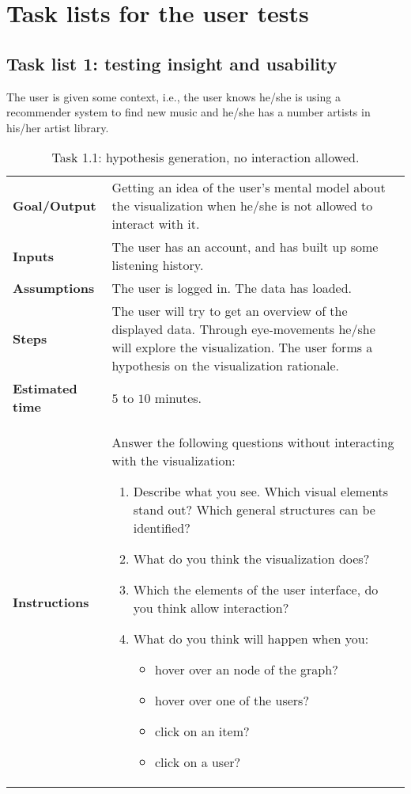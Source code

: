 \chapter{Task lists for the user tests}\label{appendix:tasklists}

\section{Task list 1: testing insight and usability}\label{appendix:tasklists:prototype1}

The user is given some context, i.e., the user knows he/she is using a recommender system to find new music and he/she has a number artists in his/her artist library.

\begin{table}
	\caption{Task 1.1: hypothesis generation, no interaction allowed.}
	\begin{tabular}{ p{80px} | p{350px} }
		\hline
		\textbf{Goal/Output}			& Getting an idea of the user's mental model about the visualization when he/she is not allowed to interact with it. \\
		\textbf{Inputs}						& The user has an account, and has built up some listening history. \\
		\textbf{Assumptions}			& The user is logged in. The data has loaded. \\
		\textbf{Steps}						& The user will try to get an overview of the displayed data. Through eye-movements he/she will explore the visualization. The user forms a hypothesis on the visualization rationale. \\
		\textbf{Estimated time} 	& $5$ to $10$ minutes. \\
		\textbf{Instructions}			&
		
		Answer the following questions without interacting with the visualization:
		\begin{enumerate}
			\item Describe what you see. Which visual elements stand out? Which general structures can be identified?
			\item What do you think the visualization does?
			\item Which the elements of the user interface, do you think allow interaction?
			\item What do you think will happen when you:
				\begin{itemize}
					\item hover over an node of the graph?
					\item hover over one of the users?
					\item click on an item?
					\item click on a user?
				\end{itemize}
		\end{enumerate}
		\\
		\hline
	\end{tabular}
	\label{table:task:t1}
\end{table}

